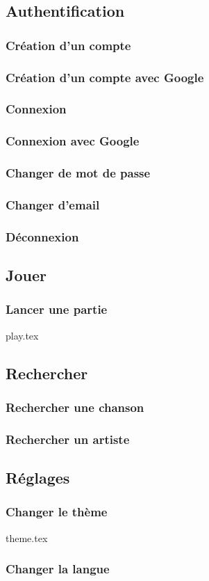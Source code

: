 \subsection{Authentification}
\subsubsection{Création d'un compte}
\subsubsection{Création d'un compte avec Google}
\subsubsection{Connexion}
\subsubsection{Connexion avec Google}
\subsubsection{Changer de mot de passe}
\subsubsection{Changer d'email}
\subsubsection{Déconnexion}

\subsection{Jouer}
\subsubsection{Lancer une partie}
{play.tex}

\subsection{Rechercher}
\subsubsection{Rechercher une chanson}
\subsubsection{Rechercher un artiste}

\subsection{Réglages}
\subsubsection{Changer le thème}
{theme.tex}

\subsubsection{Changer la langue}